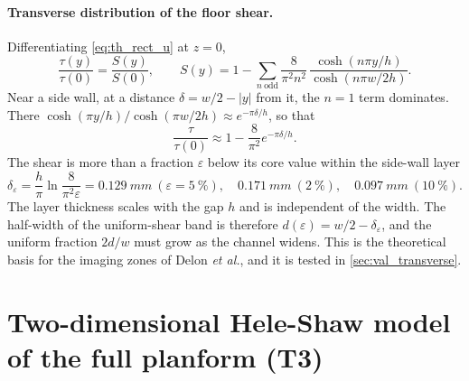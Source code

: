 \paragraph{Transverse distribution of the floor shear.} Differentiating \cref{eq:th_rect_u} at $z=0$,
\begin{equation}
\frac{\tau(y)}{\tau(0)}=\frac{S(y)}{S(0)},\qquad
S(y)=1-\sum_{n\ \mathrm{odd}}\frac{8}{\pi^2n^2}\,\frac{\cosh(n\pi y/h)}{\cosh(n\pi w/2h)} .
\label{eq:th_tau_y}
\end{equation}
Near a side wall, at a distance $\delta=w/2-|y|$ from it, the $n=1$ term dominates. There $\cosh(\pi y/h)/\cosh(\pi w/2h)\approx e^{-\pi\delta/h}$, so that
\begin{equation}
\frac{\tau}{\tau(0)}\approx1-\frac{8}{\pi^2}e^{-\pi\delta/h}.
\end{equation}
The shear is more than a fraction $\varepsilon$ below its core value within the side-wall layer
\begin{equation}
\delta_\varepsilon=\frac{h}{\pi}\ln\frac{8}{\pi^2\varepsilon}
=\SI{0.129}{mm}\ (\varepsilon=\SI{5}{\percent}),\quad
\SI{0.171}{mm}\ (\SI{2}{\percent}),\quad
\SI{0.097}{mm}\ (\SI{10}{\percent}).
\label{eq:th_delta}
\end{equation}
The layer thickness scales with the gap $h$ and is independent of the width. The half-width of the uniform-shear band is therefore $d(\varepsilon)=w/2-\delta_\varepsilon$, and the uniform fraction $2d/w$ must grow as the channel widens. This is the theoretical basis for the imaging zones of Delon \emph{et al.}, and it is tested in \cref{sec:val_transverse}.

\section{Two-dimensional Hele-Shaw model of the full planform (T3)}
\label{sec:th_T3}


